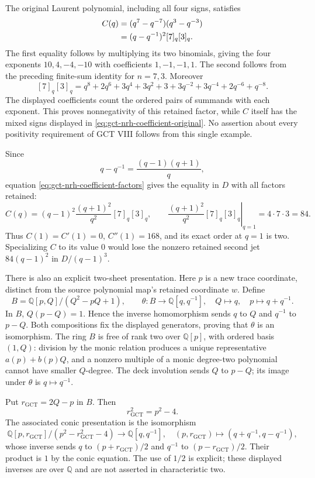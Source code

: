 The original Laurent polynomial, including all four signs, satisfies
\begin{align}
 C(q)
  &=(q^7-q^{-7})(q^3-q^{-3})\notag\\
  &=(q-q^{-1})^2[7]_q[3]_q.\label{eq:gct-nrh-coefficient-factors}
\end{align}
The first equality follows by multiplying its two binomials, giving
the four exponents $10,4,-4,-10$ with coefficients $1,-1,-1,1$.
The second follows from the preceding finite-sum identity for $n=7,3$.
Moreover
\[
 [7]_q[3]_q
 =q^8+2q^6+3q^4+3q^2+3+3q^{-2}+3q^{-4}+2q^{-6}+q^{-8}.
\]
The displayed coefficients count the ordered pairs of summands with
each exponent.  This proves nonnegativity of this retained factor,
while $C$ itself has the mixed signs displayed in
\eqref{eq:gct-nrh-coefficient-original}.  No assertion about every
positivity requirement of GCT VIII follows from this single example.

Since
\[
 q-q^{-1}=\frac{(q-1)(q+1)}q,
\]
equation \eqref{eq:gct-nrh-coefficient-factors} gives the equality in
$D$ with all factors retained:
\[
 C(q)=(q-1)^2\frac{(q+1)^2}{q^2}[7]_q[3]_q,
 \qquad
 \left.\frac{(q+1)^2}{q^2}[7]_q[3]_q\right|_{q=1}=4\cdot7\cdot3=84.
\]
Thus $C(1)=C'(1)=0$, $C''(1)=168$, and its exact order at $q=1$ is two.
Specializing $C$ to its value $0$ would lose the nonzero retained second
jet $84(q-1)^2$ in $D/(q-1)^3$.

There is also an explicit two-sheet presentation.  Here $p$ is a new trace
coordinate, distinct from the source polynomial map's retained coordinate
$w$. Define
\[
 B=\mathbb Q[p,Q]/(Q^2-pQ+1),\qquad
 \theta:B\longrightarrow\mathbb Q[q,q^{-1}],
 \quad Q\longmapsto q,\quad p\longmapsto q+q^{-1}.
\]
In $B$, $Q(p-Q)=1$.  Hence the inverse homomorphism sends $q$ to $Q$
and $q^{-1}$ to $p-Q$.  Both compositions fix the displayed generators,
proving that $\theta$ is an isomorphism.  The ring $B$ is free of rank
two over $\mathbb Q[p]$, with ordered basis $(1,Q)$: division by the
monic relation produces a unique representative $a(p)+b(p)Q$, and a
nonzero multiple of a monic degree-two polynomial cannot have smaller
$Q$-degree.  The deck involution sends $Q$ to $p-Q$; its image under
$\theta$ is $q\mapsto q^{-1}$.

Put $r_{\mathrm{GCT}}=2Q-p$ in $B$.  Then
\[
 r_{\mathrm{GCT}}^2=p^2-4.
\]
The associated conic presentation is the isomorphism
\[
 \mathbb Q[p,r_{\mathrm{GCT}}]/(p^2-r_{\mathrm{GCT}}^2-4)
  \longrightarrow\mathbb Q[q,q^{-1}],
 \quad (p,r_{\mathrm{GCT}})\longmapsto
        (q+q^{-1},q-q^{-1}),
\]
whose inverse sends $q$ to $(p+r_{\mathrm{GCT}})/2$ and $q^{-1}$ to
$(p-r_{\mathrm{GCT}})/2$.  Their product is $1$ by the conic equation.
The use of $1/2$ is explicit; these displayed inverses are over
$\mathbb Q$ and are not asserted in characteristic two.

